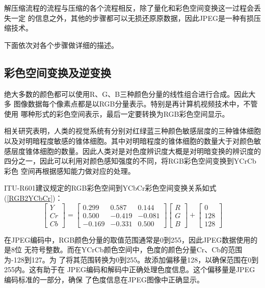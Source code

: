 \documentclass{article}
\numberwithin {equation}{section}
\begin{document}
\begin{spacing}{1.25}
  解压缩流程的流程与压缩的各个流程相反，除了量化和彩色空间变换这一过程会丢失一定
  的信息之外，其他的步骤都可以无损还原原数据，因此JPEG是一种有损压缩技术。

  下面依次对各个步骤做详细的描述。
  \subsection{彩色空间变换及逆变换}
    \vspace{1em}
    绝大多数的颜色都可以使用R、G、B三种颜色分量的线性组合进行合成。因此大多
    图像数据每个像素点都是以RGB分量表示。特别是再计算机视频技术中，不管使用
    哪种形式的彩色空间表示，最后一定要转换为RGB彩色空间显示。

    相关研究表明，人类的视觉系统有分别对红绿蓝三种颜色敏感层度的三种锥体细胞
    以及对明暗程度敏感的锥体细胞。其中对明暗程度的锥体细胞的数量大于对颜色敏
    感层度锥体细胞的数量。因此人类对是对色度辨识度大概是对明暗变换的辨识度的
    四分之一，因此可以利用对颜色感知强度的不同，将RGB彩色空间变换到YCrCb彩色
    空间再根据感知能力做对应的处理。

    ITU-R601建议规定的RGB彩色空间到YCbCr彩色空间变换关系如式(\ref{RGB2YCbCr})：
    \begin{equation}
      \begin{bmatrix}Y\\ Cr\\ Cb\end{bmatrix}=
      \begin{bmatrix}
        0.299 & 0.587 & 0.144\\
        0.500 & -0.419 & -0.081\\
        -0.169 & -0.331 & 0.500
      \end{bmatrix}
      \begin{bmatrix}R\\ G\\ B\end{bmatrix}+
      \begin{bmatrix}0\\ 128\\ 128\end{bmatrix}
      \label{RGB2YCbCr}
    \end{equation}

    在JPEG编码中，RGB颜色分量的取值范围通常是0到255，因此JPEG数据使用的是8位
    无符号整数。而在YCrCb颜色空间中，色度的颜色分量Cr、Cb的范围为-128到127。为
    了将其范围转换为0到255。故添加偏移量128，以确保范围在0到255内。这有助于在
    JPEG编码和解码中正确处理色度信息。这个偏移量是JPEG编码标准的一部分，确保
    了色度信息在JPEG图像中正确显示。


\end{spacing}
\end{document}

